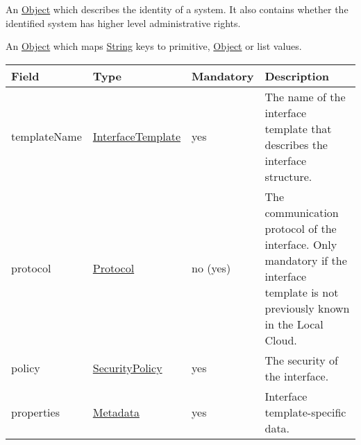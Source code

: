 \documentclass[a4paper]{arrowhead}
\newcommand{\pref}[1]{{\textcolor{ArrowheadGrey}{\hyperref[sec:model:primitives:#1]{#1}}}}
\begin{document}
\label{sec:model:Identity}

An \pref{Object} which describes the identity of a system. It also contains whether the identified system has higher level administrative rights.

\label{sec:model:Metadata}

An \pref{Object} which maps \pref{String} keys to primitive, \pref{Object} or list values.


\label{sec:model:ServiceInterfaceRequest}
 
\begin{table}[ht!]
\begin{tabularx}{\textwidth}{| p{3cm} | p{3cm} | p{2cm} | X |} \hline
\rowcolor{gray!33} Field & Type & Mandatory & Description \\ \hline
templateName & \pref{InterfaceTemplate} & yes & The name of the interface template that describes the interface structure. \\ \hline
protocol & \pref{Protocol} & no (yes) & The communication protocol of the interface. Only mandatory if the interface template is not previously known in the Local Cloud.  \\ \hline
policy & \pref{SecurityPolicy} & yes & The security of the interface. \\ \hline
properties &\hyperref[sec:model:Metadata]{Metadata} & yes & Interface template-specific data. \\ \hline
\end{tabularx}
\end{table}

\clearpage

\label{sec:model:ServiceRegistrationResponse}
 
\end{document}
